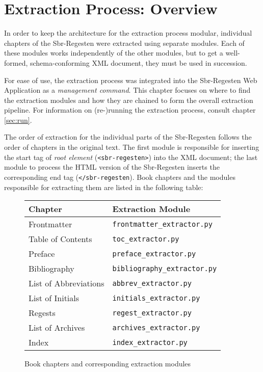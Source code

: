 \section{Extraction Process: Overview}
\label{sec:overview}

In order to keep the architecture for the extraction process modular,
individual chapters of the Sbr-Regesten were extracted using separate
modules. Each of these modules works independently of the other
modules, but to get a well-formed, schema-conforming XML document,
they must be used in succession.

For ease of use, the extraction process was integrated into the
Sbr-Regesten Web Application as a \emph{management command}. This
chapter focuses on where to find the extraction modules and how they
are chained to form the overall extraction pipeline. For information
on (re-)running the extraction process, consult chapter \ref{sec:run}.

The order of extraction for the individual parts of the Sbr-Regesten
follows the order of chapters in the original text. The first module
is responsible for inserting the start tag of \emph{root element}
(\texttt{<sbr-regesten>}) into the XML document; the last module to
process the HTML version of the Sbr-Regesten inserts the corresponding
end tag (\texttt{</sbr-regesten}). Book chapters and the modules
responsible for extracting them are listed in the following table:

\begin{figure}[h]
  \centering
  \begin{tabular}{l|l}
    \hline
    Chapter & Extraction Module \\
    \hline
    Frontmatter & \texttt{frontmatter\_extractor.py} \\
    Table of Contents & \texttt{toc\_extractor.py} \\
    Preface & \texttt{preface\_extractor.py} \\
    Bibliography & \texttt{bibliography\_extractor.py} \\
    List of Abbreviations & \texttt{abbrev\_extractor.py} \\
    List of Initials & \texttt{initials\_extractor.py} \\
    Regests & \texttt{regest\_extractor.py} \\
    List of Archives & \texttt{archives\_extractor.py} \\
    Index & \texttt{index\_extractor.py} \\
    \hline
  \end{tabular}
  \caption{Book chapters and corresponding extraction modules}
  \label{fig:extraction-modules}
\end{figure}

